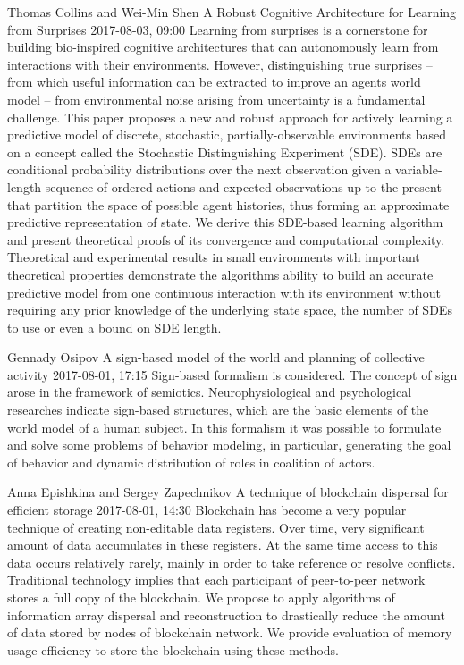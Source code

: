 \documentclass[10pt,fleqn,openany]{book} %
\begin{document}
\begin{enumerate}
	
	\paperabstract
	{Thomas Collins and Wei-Min Shen}
	{A Robust Cognitive Architecture for Learning from Surprises}
	{2017-08-03, 09:00}
	{Learning from surprises is a cornerstone for building bio-inspired cognitive architectures that can autonomously learn from interactions with their environments. However, distinguishing true surprises -- from which useful information can be extracted to improve an agents world model -- from environmental noise arising from uncertainty is a fundamental challenge. This paper proposes a new and robust approach for actively learning a predictive model of discrete, stochastic, partially-observable environments  based on a concept called the Stochastic Distinguishing Experiment (SDE). SDEs are conditional probability distributions over the next observation given a variable-length sequence of ordered actions and expected observations up to the present that partition the space of possible agent histories, thus forming an approximate predictive representation of state. We derive this SDE-based learning algorithm and present theoretical proofs of its convergence and computational complexity. Theoretical and experimental results in small environments with important theoretical properties demonstrate the algorithms ability to build an accurate predictive model from one continuous interaction with its environment without requiring any prior knowledge of the underlying state space, the number of SDEs to use or even a bound on SDE length.}
	
	
	\paperabstract
	{Gennady Osipov}
	{A sign-based model of the world and planning of collective activity}
	{2017-08-01, 17:15}
	{Sign-based formalism is considered. The concept of sign arose in the framework of semiotics. Neurophysiological and psychological researches indicate sign-based structures, which are the basic elements of the world model of a human subject.  In this formalism it was possible to formulate and solve some problems of behavior modeling, in particular, generating the goal of behavior and dynamic distribution of roles in coalition of actors.}
	
	
	\paperabstract
	{Anna Epishkina and Sergey Zapechnikov}
	{A technique of blockchain dispersal for efficient storage}
	{2017-08-01, 14:30}
	{Blockchain has become a very popular technique of creating non-editable data registers. Over time, very significant amount of data accumulates in these registers. At the same time access to this data occurs relatively rarely, mainly in order to take reference or resolve conflicts. Traditional technology implies that each participant of peer-to-peer network stores a full copy of the blockchain. We propose to apply algorithms of information array dispersal and reconstruction to drastically reduce the amount of data stored by nodes of blockchain network. We provide evaluation of memory usage efficiency to store the blockchain using these methods.}
	

\end{enumerate}
\end{document}
